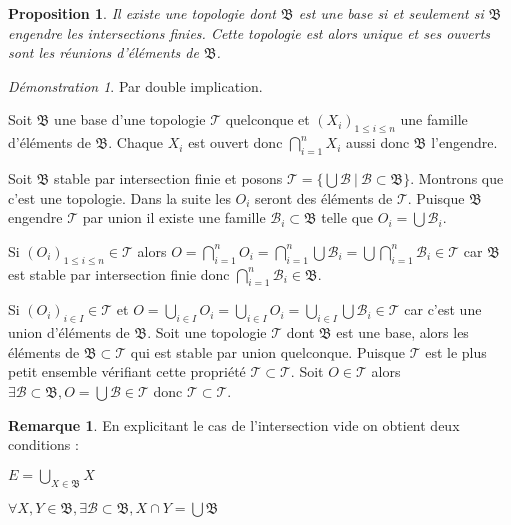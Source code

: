 \documentclass[a4paper, 11pt, french]{book}
\newenvironment{itemise}{\itemize}{\enditemize}
\theoremstyle{plain} %
\newtheorem{proposition}{Proposition}
\theoremstyle{definition} %
\newtheorem{remarque}{Remarque}
\theoremstyle{remark} %
\newtheorem*{demonstration}{Démonstration}
\newcommand{\1}{\mathds{1}}
\newcommand{\infegal}{\leqslant}
\newcommand\ens[2]{\{#1 \ |\ #2\}}
\begin{document}
\begin{proposition}
	Il existe une topologie dont $\mathfrak{B}$ est une base si et seulement si $\mathfrak{B}$ engendre les intersections finies.
	Cette topologie est alors unique et ses ouverts sont les réunions d'éléments de $\mathfrak{B}$.
\end{proposition}

\begin{demonstration}
	Par double implication.
	\begin{itemise}
		\item Soit $\mathfrak{B}$ une base d'une topologie $\mathscr{T}$ quelconque et $(X_i)_{1\infegal i\infegal n}$ une famille d'éléments de $\mathfrak{B}$.
		Chaque $X_i$ est ouvert donc $\bigcap_{i=1}^nX_i$ aussi donc $\mathfrak{B}$ l'engendre.
		\item Soit $\mathfrak{B}$ stable par intersection finie et posons $\mathcal{T}=\ens{\bigcup\mathcal{B}}{\mathcal{B}\subset\mathfrak{B}}$.
		Montrons que c'est une topologie.
		Dans la suite les $O_i$ seront des éléments de $\mathcal{T}$.
		Puisque $\mathfrak{B}$ engendre $\mathcal{T}$ par union il existe une famille $\mathcal{B}_i\subset\mathfrak{B}$ telle que $O_i=\bigcup\mathcal{B}_i$.
		\begin{itemise}
			\item Si $(O_i)_{1\infegal i\infegal n}\in\mathcal{T}$ alors $O=\bigcap_{i=1}^nO_i=\bigcap_{i=1}^n\bigcup\mathcal{B}_i=\bigcup\bigcap_{i=1}^n\mathcal{B}_i\in\mathcal{T}$ car $\mathfrak{B}$ est stable par intersection finie donc $\bigcap_{i=1}^n\mathcal{B}_i\in\mathfrak{B}$.
			\item Si $(O_i)_{i\in I}\in\mathcal{T}$ et $O=\bigcup_{i\in I}O_i=\bigcup_{i\in I}O_i=\bigcup_{i\in I}\bigcup\mathcal{B}_i\in\mathcal{T}$ car c'est une union d'éléments de $\mathfrak{B}$.
		\end{itemise}
	\end{itemise}
	Soit une topologie $\mathscr{T}$ dont $\mathfrak{B}$ est une base, alors les éléments de $\mathfrak{B}\subset\mathscr{T}$ qui est stable par union quelconque.
	Puisque $\mathcal{T}$ est le plus petit ensemble vérifiant cette propriété $\mathcal{T}\subset\mathscr{T}$.
	Soit $O\in\mathscr{T}$ alors $\exists\mathcal{B}\subset\mathfrak{B}, O=\bigcup\mathcal{B}\in\mathcal{T}$ donc $\mathscr{T}\subset\mathscr{T}$.
\end{demonstration}

\begin{remarque}
		En explicitant le cas de l'intersection vide on obtient deux conditions :
		\begin{itemise}
			\item $E=\bigcup_{X\in\mathfrak{B}}X$
			\item $\forall X, Y\in\mathfrak{B}, \exists \mathcal{B}\subset\mathfrak{B}, X\cap Y=\bigcup\mathfrak{B}$
		\end{itemise}
\end{remarque}
\end{document}
